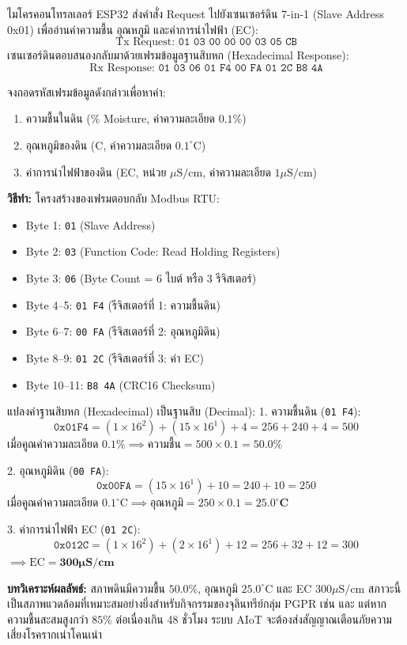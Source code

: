 \begin{worked}
ไมโครคอนโทรลเลอร์ ESP32 ส่งคำสั่ง Request ไปยังเซนเซอร์ดิน 7-in-1 (Slave Address 0x01) เพื่ออ่านค่าความชื้น อุณหภูมิ และค่าการนำไฟฟ้า (EC):
$$\text{Tx Request: } \texttt{01 03 00 00 00 03 05 CB}$$
เซนเซอร์ดินตอบสนองกลับมาด้วยเฟรมข้อมูลฐานสิบหก (Hexadecimal Response):
$$\text{Rx Response: } \texttt{01 03 06 01 F4 00 FA 01 2C B8 4A}$$

จงถอดรหัสเฟรมข้อมูลดังกล่าวเพื่อหาค่า:
\begin{enumerate}
    \item ความชื้นในดิน (\% Moisture, ค่าความละเอียด $0.1\%$)
    \item อุณหภูมิของดิน (\degree C, ค่าความละเอียด $0.1^\circ\text{C}$)
    \item ค่าการนำไฟฟ้าของดิน (EC, หน่วย $\mu\text{S/cm}$, ค่าความละเอียด $1\mu\text{S/cm}$)
\end{enumerate}

\textbf{วิธีทำ:}
โครงสร้างของเฟรมตอบกลับ Modbus RTU:
\begin{itemize}
    \item Byte 1: \texttt{01} (Slave Address)
    \item Byte 2: \texttt{03} (Function Code: Read Holding Registers)
    \item Byte 3: \texttt{06} (Byte Count = 6 ไบต์ หรือ 3 รีจิสเตอร์)
    \item Byte 4--5: \texttt{01 F4} (รีจิสเตอร์ที่ 1: ความชื้นดิน)
    \item Byte 6--7: \texttt{00 FA} (รีจิสเตอร์ที่ 2: อุณหภูมิดิน)
    \item Byte 8--9: \texttt{01 2C} (รีจิสเตอร์ที่ 3: ค่า EC)
    \item Byte 10--11: \texttt{B8 4A} (CRC16 Checksum)
\end{itemize}

แปลงค่าฐานสิบหก (Hexadecimal) เป็นฐานสิบ (Decimal):
1. ความชื้นดิน (\texttt{01 F4}):
$$\texttt{0x01F4} = (1 \times 16^2) + (15 \times 16^1) + 4 = 256 + 240 + 4 = 500$$
เมื่อคูณค่าความละเอียด $0.1\% \implies \text{ความชื้น} = 500 \times 0.1 = \mathbf{50.0\%}$

2. อุณหภูมิดิน (\texttt{00 FA}):
$$\texttt{0x00FA} = (15 \times 16^1) + 10 = 240 + 10 = 250$$
เมื่อคูณค่าความละเอียด $0.1^\circ\text{C} \implies \text{อุณหภูมิ} = 250 \times 0.1 = \mathbf{25.0^\circ\text{C}}$

3. ค่าการนำไฟฟ้า EC (\texttt{01 2C}):
$$\texttt{0x012C} = (1 \times 16^2) + (2 \times 16^1) + 12 = 256 + 32 + 12 = 300$$
$\implies \text{EC} = \mathbf{300 \mu\text{S/cm}}$

\textbf{บทวิเคราะห์ผลลัพธ์:} สภาพดินมีความชื้น $50.0\%$, อุณหภูมิ $25.0^\circ\text{C}$ และ EC $300\mu\text{S/cm}$ สภาวะนี้เป็นสภาพแวดล้อมที่เหมาะสมอย่างยิ่งสำหรับกิจกรรมของจุลินทรีย์กลุ่ม PGPR เช่น  และ  แต่หากความชื้นสะสมสูงกว่า $85\%$ ต่อเนื่องเกิน 48 ชั่วโมง ระบบ AIoT จะต้องส่งสัญญาณเตือนภัยความเสี่ยงโรครากเน่าโคนเน่า
\end{worked}

